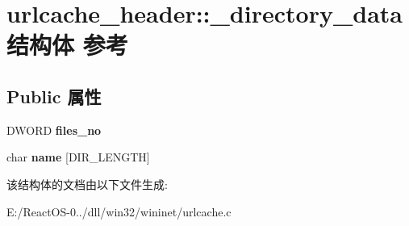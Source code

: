 \hypertarget{structurlcache__header_1_1__directory__data}{}\section{urlcache\+\_\+header\+:\+:\+\_\+directory\+\_\+data结构体 参考}
\label{structurlcache__header_1_1__directory__data}
\subsection*{Public 属性}
\begin{DoxyCompactItemize}
\item 
\mbox{\label{structurlcache__header_1_1__directory__data_ad89b857d14dca3f85c2baecfd2648946}} 
D\+W\+O\+RD {\bfseries files\+\_\+no}
\item 
\mbox{\label{structurlcache__header_1_1__directory__data_aa13517f1edf2b73fef4c0cba7ac21029}} 
char {\bfseries name} \mbox{[}D\+I\+R\+\_\+\+L\+E\+N\+G\+TH\mbox{]}
\end{DoxyCompactItemize}


该结构体的文档由以下文件生成\+:\begin{DoxyCompactItemize}
\item 
E\+:/\+React\+O\+S-\/0../dll/win32/wininet/urlcache.\+c\end{DoxyCompactItemize}
